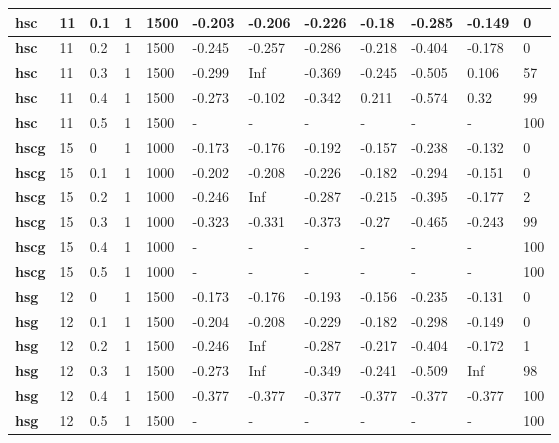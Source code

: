 \begin{longtable}[h]{|p{0.8cm}|p{1.5cm}|p{1cm}|p{1cm}|p{1cm}|p{1cm}|p{1cm}|p{1cm}|p{1cm}|p{1cm}|p{1cm}|p{1.5cm}|}
    \\ \hline
  \textbf{hsc } &  11         & 0.1 & 1 & 1500 & -0.203 & -0.206 & -0.226 &  -0.18 & -0.285 & -0.149 &   0
    \\ \hline
  \textbf{hsc } &  11         & 0.2 & 1 & 1500 & -0.245 & -0.257 & -0.286 & -0.218 & -0.404 & -0.178 &   0
    \\ \hline
  \textbf{hsc } &  11         & 0.3 & 1 & 1500 & -0.299 &    Inf & -0.369 & -0.245 & -0.505 &  0.106 &  57
    \\ \hline
  \textbf{hsc } &  11         & 0.4 & 1 & 1500 & -0.273 & -0.102 & -0.342 &  0.211 & -0.574 &   0.32 &  99
    \\ \hline
  \textbf{hsc } &  11         & 0.5 & 1 & 1500 & - & - & - & - & - & - & 100
    \\ \hline
  \textbf{hscg} &  15         &   0 & 1 & 1000 & -0.173 & -0.176 & -0.192 & -0.157 & -0.238 & -0.132 &   0
    \\ \hline
  \textbf{hscg} &  15         & 0.1 & 1 & 1000 & -0.202 & -0.208 & -0.226 & -0.182 & -0.294 & -0.151 &   0
    \\ \hline
  \textbf{hscg} &  15         & 0.2 & 1 & 1000 & -0.246 &    Inf & -0.287 & -0.215 & -0.395 & -0.177 &   2
    \\ \hline
  \textbf{hscg} &  15         & 0.3 & 1 & 1000 & -0.323 & -0.331 & -0.373 &  -0.27 & -0.465 & -0.243 &  99
    \\ \hline
  \textbf{hscg} &  15         & 0.4 & 1 & 1000 & - & - & - & - & - & - & 100
    \\ \hline
  \textbf{hscg} &  15         & 0.5 & 1 & 1000 & - & - & - & - & - & - & 100
    \\ \hline
  \textbf{hsg } &  12         &   0 & 1 & 1500 & -0.173 & -0.176 & -0.193 & -0.156 & -0.235 & -0.131 &   0
    \\ \hline
  \textbf{hsg } &  12         & 0.1 & 1 & 1500 & -0.204 & -0.208 & -0.229 & -0.182 & -0.298 & -0.149 &   0
    \\ \hline
  \textbf{hsg } &  12         & 0.2 & 1 & 1500 & -0.246 &    Inf & -0.287 & -0.217 & -0.404 & -0.172 &   1
    \\ \hline
  \textbf{hsg } &  12         & 0.3 & 1 & 1500 & -0.273 &    Inf & -0.349 & -0.241 & -0.509 &    Inf &  98
    \\ \hline
  \textbf{hsg } &  12         & 0.4 & 1 & 1500 & -0.377 & -0.377 & -0.377 & -0.377 & -0.377 & -0.377 & 100
    \\ \hline
  \textbf{hsg } &  12         & 0.5 & 1 & 1500 & - & - & - & - & - & - & 100
    \\ \hline
 \end{longtable}
